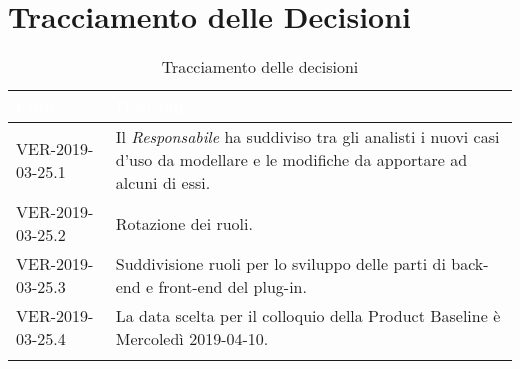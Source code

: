 \newpage
\section{Tracciamento delle Decisioni}

\begin{longtable}{|C{.40\textwidth}|C{.60\textwidth}|}
\hline
{}\textbf{\textcolor{white}{Codice}} & \textbf{\textcolor{white}{Decisione}}\\
\hline
VER-2019-03-25.1 & Il \textit{Responsabile} ha suddiviso tra gli analisti i nuovi casi d'uso da modellare e le modifiche da apportare ad alcuni di essi.  \\
\hline
{}VER-2019-03-25.2 & Rotazione dei ruoli. \\
\hline
VER-2019-03-25.3 & Suddivisione ruoli per lo sviluppo delle parti di back-end e front-end del plug-in.\\
\hline
{}VER-2019-03-25.4 & La data scelta per il colloquio della Product Baseline è Mercoledì 2019-04-10.\\
\hline

\caption{Tracciamento delle decisioni}
\end{longtable}
